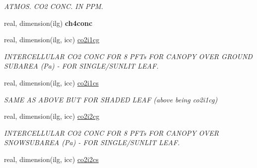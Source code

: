 \begin{DoxyCompactItemize}
\begin{DoxyCompactList}\small\item\em A\+T\+M\+O\+S. C\+O2 C\+O\+N\+C. I\+N P\+P\+M. \end{DoxyCompactList}\item 
\hypertarget{structctem__statevars_1_1veg__gat_ad279e2e4a75273419de38f2a823f3461}{}real, dimension(ilg) {\bfseries ch4conc}\label{structctem__statevars_1_1veg__gat_ad279e2e4a75273419de38f2a823f3461}

\item 
\hypertarget{structctem__statevars_1_1veg__gat_ad1a445648a14ba9da951c7b7357dc653}{}real, dimension(ilg, icc) \hyperlink{structctem__statevars_1_1veg__gat_ad1a445648a14ba9da951c7b7357dc653}{co2i1cg}\label{structctem__statevars_1_1veg__gat_ad1a445648a14ba9da951c7b7357dc653}

\begin{DoxyCompactList}\small\item\em I\+N\+T\+E\+R\+C\+E\+L\+L\+U\+L\+A\+R C\+O2 C\+O\+N\+C F\+O\+R 8 P\+F\+Ts F\+O\+R C\+A\+N\+O\+P\+Y O\+V\+E\+R G\+R\+O\+U\+N\+D S\+U\+B\+A\+R\+E\+A (Pa) -\/ F\+O\+R S\+I\+N\+G\+L\+E/\+S\+U\+N\+L\+I\+T L\+E\+A\+F. \end{DoxyCompactList}\item 
\hypertarget{structctem__statevars_1_1veg__gat_a8487fff92f05e1ea54349b8b8b4438d5}{}real, dimension(ilg, icc) \hyperlink{structctem__statevars_1_1veg__gat_a8487fff92f05e1ea54349b8b8b4438d5}{co2i1cs}\label{structctem__statevars_1_1veg__gat_a8487fff92f05e1ea54349b8b8b4438d5}

\begin{DoxyCompactList}\small\item\em S\+A\+M\+E A\+S A\+B\+O\+V\+E B\+U\+T F\+O\+R S\+H\+A\+D\+E\+D L\+E\+A\+F (above being co2i1cg) \end{DoxyCompactList}\item 
\hypertarget{structctem__statevars_1_1veg__gat_ae0ae6e843c74f010c992bb3cca684d44}{}real, dimension(ilg, icc) \hyperlink{structctem__statevars_1_1veg__gat_ae0ae6e843c74f010c992bb3cca684d44}{co2i2cg}\label{structctem__statevars_1_1veg__gat_ae0ae6e843c74f010c992bb3cca684d44}

\begin{DoxyCompactList}\small\item\em I\+N\+T\+E\+R\+C\+E\+L\+L\+U\+L\+A\+R C\+O2 C\+O\+N\+C F\+O\+R 8 P\+F\+Ts F\+O\+R C\+A\+N\+O\+P\+Y O\+V\+E\+R S\+N\+O\+W\+S\+U\+B\+A\+R\+E\+A (Pa) -\/ F\+O\+R S\+I\+N\+G\+L\+E/\+S\+U\+N\+L\+I\+T L\+E\+A\+F. \end{DoxyCompactList}\item 
\hypertarget{structctem__statevars_1_1veg__gat_a025e220fe304f20779459b92fdbb49d7}{}real, dimension(ilg, icc) \hyperlink{structctem__statevars_1_1veg__gat_a025e220fe304f20779459b92fdbb49d7}{co2i2cs}\label{structctem__statevars_1_1veg__gat_a025e220fe304f20779459b92fdbb49d7}


\end{DoxyCompactItemize}
